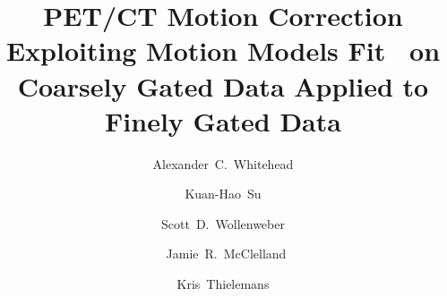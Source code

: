 \documentclass[portrait, color=UCLburgundy, margin=1cm]{uclposter}
\begin{document}
    \title{PET/CT Motion Correction Exploiting Motion Models Fit \newline~on Coarsely Gated Data Applied to Finely Gated Data}
    
    \author[12*]{Alexander~C.~Whitehead}
    \author[3]{Kuan-Hao~Su}
    \author[3]{Scott~D.~Wollenweber}
    \author[2]{\newline~Jamie~R.~McClelland}
    \author[12]{Kris~Thielemans}
    
    
    \maketitle
\end{document}
